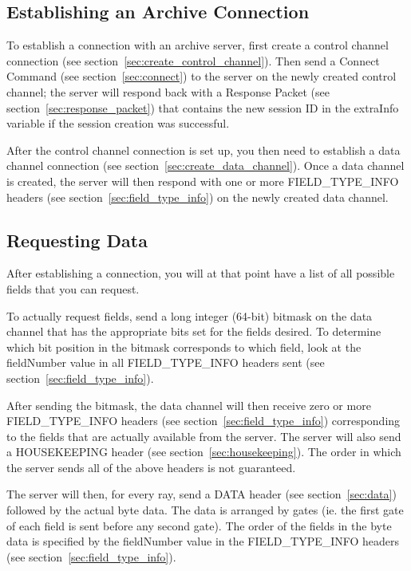 \documentclass[10pt]{article}
\begin{document}
\subsection{Establishing an Archive Connection}
To establish a connection with an archive server, first create a control channel connection (see section~\ref{sec:create_control_channel}). Then send a Connect Command (see section~\ref{sec:connect}) to the server on the newly created control channel; the server will respond back with a Response Packet (see section~\ref{sec:response_packet}) that contains the new session ID in the extraInfo variable if the session creation was successful.

After the control channel connection is set up, you then need to establish a data channel connection (see section~\ref{sec:create_data_channel}). Once a data channel is created, the server will then respond with one or more FIELD\_TYPE\_INFO headers (see section~\ref{sec:field_type_info}) on the newly created data channel.

\subsection{Requesting Data}
\label{sec:request_data}
After establishing a connection, you will at that point have a list of all possible fields that you can request.

To actually request fields, send a long integer (64-bit) bitmask on the data channel that has the appropriate bits set for the fields desired. To determine which bit position in the bitmask corresponds to which field, look at the fieldNumber value in all FIELD\_TYPE\_INFO headers sent (see section~\ref{sec:field_type_info}).

After sending the bitmask, the data channel will then receive zero or more FIELD\_TYPE\_INFO headers (see section~\ref{sec:field_type_info}) corresponding to the fields that are actually available from the server. The server will also send a HOUSEKEEPING header (see section~\ref{sec:housekeeping}). The order in which the server sends all of the above headers is not guaranteed.

The server will then, for every ray, send a DATA header (see section~\ref{sec:data}) followed by the actual byte data. The data is arranged by gates (ie. the first gate of each field is sent before any second gate). The order of the fields in the byte data is specified by the fieldNumber value in the FIELD\_TYPE\_INFO headers (see section~\ref{sec:field_type_info}).
\end{document}
